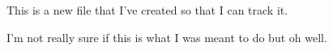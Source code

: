 This is a new file that I've created so that I can track it.

I'm not really sure if this is what I was meant to do but oh well.


